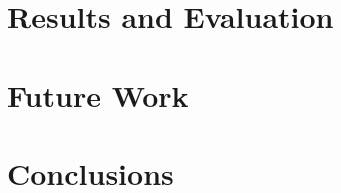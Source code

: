 \documentclass[12pt]{report}
\begin{document}
\section{Results and Evaluation}\label{Results}

\section{Future Work}\label{FutureWork}


\section{Conclusions}\label{Conclusions}
\end{document}

